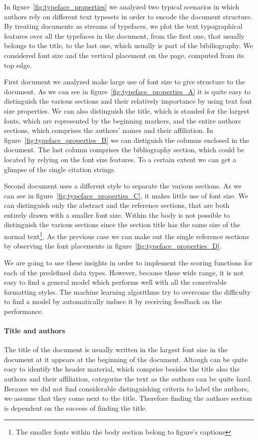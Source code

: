 In figure~\ref{fig:typeface_properties} we analyzed two typical scenarios in which authors rely on different text typesets in order to encode the document structure. By treating documents as streams of typefaces, we plot the text typographical features over all the typefaces in the document, from the first one, that usually belongs to the title, to the last one, which usually is part of the bibiliography. We considered font size and the vertical placement on the page, computed from its top edge.

First document we analyzed make large use of font size to give structure to the document. As we can see in figure~\ref{fig:typeface_properties_A} it is quite easy to distinguish the various sections and their relatively importance by using text font size properties. We can also distinguish the title, which is standed for the largest fonts, which are represented by the beginning markers, and the entire authors sections, which comprises the authors' names and their affiliation. In figure~\ref{fig:typeface_properties_B} we can distiguish the columns enclosed in the document. The last column comprises the bibliography section, which could be located by relying on the font size features. To a certain extent we can get a glimpse of the single citation strings.

Second document uses a different style to separate the various sections. As we can see in figure~\ref{fig:typeface_properties_C}, it makes little use of font size. We can distinguish only the abstract and the reference sections, that are both entirely drawn with a smaller font size. Within the body is not possible to distinguish the various sections since the section title has the same size of the normal text\footnote{The smaller fonts within the body section belong to figure's captions}. As the previous case we can make out the single reference sections by observing the font placements in figure~\ref{fig:typeface_properties_D}.

We are going to use these insights in order to implement the scoring functions for each of the predefined data types. However, because these wide range, it is not easy to find a general model which performs well with all the conceivable formatting styles. The machine learning algorithms try to overcome the difficulty to find a model by automatically induce it by receiving feedback on the performance.

\paragraph{Title and authors} The title of the document is usually written in the largest font size in the document at it appears at the beginning of the document. Altough can be quite easy to identify the header material, which comprise besides the title also the authors and their affiliation, categorize the text as the authors can be quite hard. Because we did not find considerable distinguishing criteria to label the authors, we assume that they come next to the title. Therefore finding the authors section is dependent on the success of finding the title.

